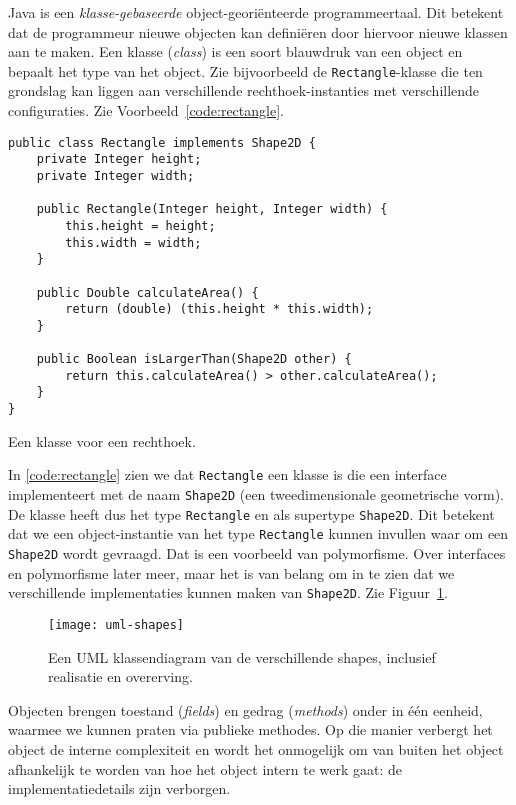 Java is een \emph{klasse-gebaseerde} object-georiënteerde programmeertaal.
Dit betekent dat de programmeur nieuwe objecten kan definiëren door hiervoor 
nieuwe klassen aan te maken. Een klasse (\textit{class}) is een soort 
blauwdruk van een object en bepaalt het type van het object.
Zie bijvoorbeeld de \texttt{Rectangle}-klasse die ten grondslag kan 
liggen aan verschillende rechthoek-instanties met verschillende configuraties.
Zie Voorbeeld~\ref{code:rectangle}.

\begin{listing}[H]
\begin{verbatim}
public class Rectangle implements Shape2D {
    private Integer height;
    private Integer width;

    public Rectangle(Integer height, Integer width) {
        this.height = height;
        this.width = width;
    }

    public Double calculateArea() {
        return (double) (this.height * this.width);
    }

    public Boolean isLargerThan(Shape2D other) {
        return this.calculateArea() > other.calculateArea();
    }
}
\end{verbatim}
\caption{Een klasse voor een rechthoek.}
\label{code:rectangle}
\end{listing}

In \ref{code:rectangle} zien we dat \texttt{Rectangle} een klasse is
die een interface implementeert met de naam \texttt{Shape2D} 
(een tweedimensionale geometrische vorm). De klasse heeft 
dus het type \texttt{Rectangle} en als supertype \texttt{Shape2D}. Dit betekent 
dat we een object-instantie van het type \texttt{Rectangle} kunnen invullen 
waar om een \texttt{Shape2D} wordt gevraagd. Dat is een voorbeeld van polymorfisme.
Over interfaces en polymorfisme later meer, maar het is van belang om in te zien dat 
we verschillende implementaties kunnen maken van \texttt{Shape2D}. Zie Figuur~\ref{fig:uml-shapes}.

\begin{figure}[H]
    \centering
    \texttt{[image: uml-shapes]}
    \caption{Een UML klassendiagram van de verschillende shapes, inclusief realisatie en overerving.}
    \label{fig:uml-shapes}
\end{figure}

Objecten brengen toestand (\textit{fields}) en gedrag (\textit{methods}) onder 
in één eenheid, waarmee we kunnen praten via publieke methodes. 
Op die manier verbergt het object de interne complexiteit en wordt het onmogelijk
om van buiten het object afhankelijk te worden van hoe het object intern te werk gaat:
de implementatiedetails zijn verborgen.

